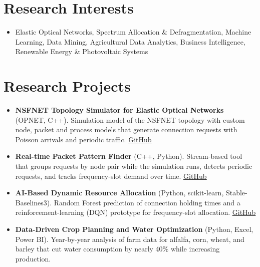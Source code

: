 \documentclass[10pt]{article}
\newenvironment{bullets}{\begin{itemize}[leftmargin=1.2em,topsep=1pt,itemsep=1pt,parsep=0pt]}{\end{itemize}}
\begin{document}
\section{Research Interests}
\begin{bullets}
\item Elastic Optical Networks, Spectrum Allocation \& Defragmentation, Machine Learning, Data Mining, Agricultural Data Analytics, Business Intelligence, Renewable Energy \& Photovoltaic Systems
\end{bullets}

\section{Research Projects}
\begin{bullets}
\item \textbf{NSFNET Topology Simulator for Elastic Optical Networks} (OPNET, C++). Simulation model of the NSFNET topology with custom node, packet and process models that generate connection requests with Poisson arrivals and periodic traffic. \href{https://github.com/malayerimahdi/NSFNET-Network-Topology-Simulator-on-Opnet-For-Elastic-Optical-Network-EON-}{\underline{GitHub}}
\item \textbf{Real-time Packet Pattern Finder} (C++, Python). Stream-based tool that groups requests by node pair while the simulation runs, detects periodic requests, and tracks frequency-slot demand over time. \href{https://github.com/malayerimahdi/EON-Simulator-Real-time-Packet-Pattern-Finder-}{\underline{GitHub}}
\item \textbf{AI-Based Dynamic Resource Allocation} (Python, scikit-learn, Stable-Baselines3). Random Forest prediction of connection holding times and a reinforcement-learning (DQN) prototype for frequency-slot allocation. \href{https://github.com/malayerimahdi/AI-Based-Dynamic-Resource-Allocation-for-Reducing-Blocking-Probability}{\underline{GitHub}}
\item \textbf{Data-Driven Crop Planning and Water Optimization} (Python, Excel, Power BI). Year-by-year analysis of farm data for alfalfa, corn, wheat, and barley that cut water consumption by nearly 40\% while increasing production.
\end{bullets}
\end{document}
